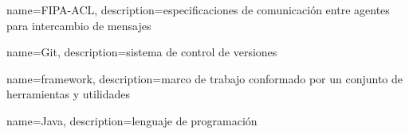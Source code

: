 {
    name=FIPA-ACL,
    description={especificaciones de comunicación entre agentes para intercambio de mensajes}
}

{
    name=Git,
    description={sistema de control de versiones}
}

{
    name=framework,
    description={marco de trabajo conformado por un conjunto de herramientas y utilidades}
}

{
    name=Java,
    description={lenguaje de programación}
}

